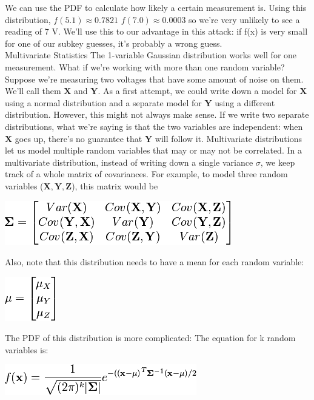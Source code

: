     We can use the PDF to calculate how likely a certain measurement is. Using this distribution,
    $f(5.1) \approx 0.7821$
    $f(7.0) \approx 0.0003$
    so we're very unlikely to see a reading of 7 V. We'll use this to our advantage in this attack: if f(x) is very small for one of our subkey guesses, it's probably a wrong guess.\\
    Multivariate Statistics
    The 1-variable Gaussian distribution works well for one measurement. What if we're working with more than one random variable?
    Suppose we're measuring two voltages that have some amount of noise on them. We'll call them $\mathbf{X}$ and $\mathbf{Y}$. As a first attempt, we could write down a model for $\mathbf{X}$ using a normal distribution and a separate model for $\mathbf{Y}$ using a different distribution. However, this might not always make sense. If we write two separate distributions, what we're saying is that the two variables are independent: when $\mathbf{X}$ goes up, there's no guarantee that $\mathbf{Y}$ will follow it.
    Multivariate distributions let us model multiple random variables that may or may not be correlated. In a multivariate distribution, instead of writing down a single variance $\sigma$, we keep track of a whole matrix of covariances. For example, to model three random variables ($\mathbf{X}, \mathbf{Y}, \mathbf{Z}$), this matrix would be\\
    \begin{minipage}{\linewidth}
      \centering
      \includegraphics{images/Lecture_5/cov.png}
      \end{minipage}
    Also, note that this distribution needs to have a mean for each random variable:\\
       \begin{minipage}{\linewidth}
      \centering
      \includegraphics{images/Lecture_5/mu.png}
      \end{minipage}
    The PDF of this distribution is more complicated: The equation for k random variables is:\\
     \begin{minipage}{\linewidth}
      \centering
      \includegraphics{images/Lecture_5/dist.png}
      \end{minipage}

